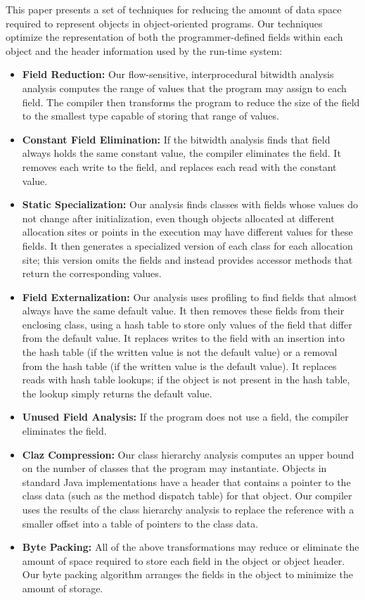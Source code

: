 \documentclass{acmconf}
\begin{document}
This paper presents a set of techniques for reducing the
amount of data space required to represent objects
in object-oriented programs. Our techniques optimize
the representation of both the programmer-defined fields
within each object and the header information used by the
run-time system:
\begin{itemize}
\item {\bf Field Reduction:} 
Our flow-sensitive, interprocedural bitwidth analysis
analysis computes the range of values that the program
may assign to each field. The compiler then transforms the program
to reduce the size of the field to the smallest type
capable of storing that range of values. 
\item {\bf Constant Field Elimination:} 
If the bitwidth analysis finds that field always holds
the same constant value, the compiler eliminates the field. 
It removes each write to the field, and replaces each read
with the constant value.
\item {\bf Static Specialization:} Our analysis finds 
classes with fields whose values do not change after initialization,
even though objects allocated at different allocation sites
or points in the execution may
have different values for these fields. It then generates 
a specialized version of each class for each allocation site;
this version omits the fields and instead provides accessor
methods that return the corresponding values. 
\item {\bf Field Externalization:} Our analysis uses profiling
to find fields that almost always have the same default value. 
It then removes these fields from their enclosing class, 
using a hash table to store only values of the field that differ
from the default value. It replaces writes to the field with
an insertion into the hash table (if the written value is not the
default value) or a removal from the hash table (if the written value
is the default value). It replaces reads with hash table lookups; 
if the object is not present in the hash table, the lookup simply
returns the default value. 
\item {\bf Unused Field Analysis:} If the program does not
use a field, the compiler eliminates the field. 
\item {\bf Claz Compression:} Our class hierarchy analysis
computes an upper bound on the number of classes that the
program may instantiate. Objects in standard 
Java implementations have a header that contains a pointer
to the class data (such as the method dispatch table) for that object. 
Our compiler uses the results of the class
hierarchy analysis to replace the reference with a smaller
offset into a table of pointers to the class data. 
\item {\bf Byte Packing:} All of the above transformations may
reduce or eliminate the amount of space required to store each
field in the object or object header. Our byte packing algorithm
arranges the fields in the object to minimize the amount of 
storage. 
\end{itemize}
\end{document}
